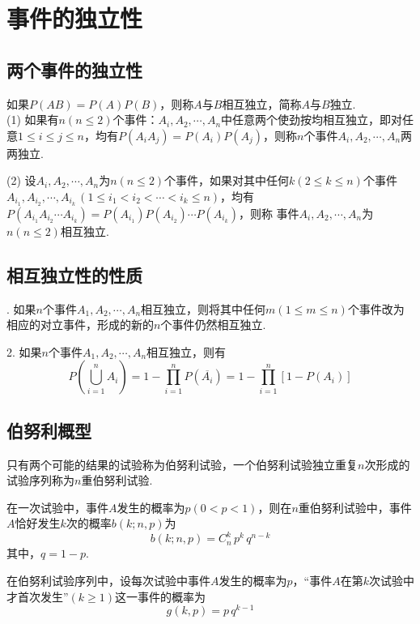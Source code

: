 \section{事件的独立性}
\subsection{两个事件的独立性}
如果$P(AB)=P(A)P(B)$，则称$A$与$B$相互独立，简称$A$与$B$独立.\jg\\
(1)  如果有$n(n\le 2)$个事件：$A_i,A_2,\cdots,A_n$中任意两个使劲按均相互独立，即对任意$1\le i\le j \le n$，均有$P(A_iA_j)=P(A_i)P(A_j)$，则称$n$个事件$A_i,A_2,\cdots,A_n$两两独立.
\par (2)  设$A_i,A_2,\cdots,A_n$为$n(n\le 2)$个事件，如果对其中任何$k(2\le k\le n)$个事件$A_{i_1},A_{i_2},\cdots,A_{i_k}\,(1 \le i_1<i_2<\cdots<i_k\le n)$，均有$P(A_{i_1}A_{i_2}\cdots A_{i_k})=P(A_{i_1})P(A_{i_2})\cdots P(A_{i_k})$，则称
事件$A_i,A_2,\cdots,A_n$为$n(n\le 2)$相互独立.

\subsection{相互独立性的性质}
.  如果$n$个事件$A_1,A_2,⋯,A_n$相互独立，则将其中任何$m(1\leq m \leq n)$个事件改为相应的对立事件，形成的新的$n$个事件仍然相互独立.
\par 2.  如果$n$个事件$A_1,A_2,⋯,A_n$相互独立，则有
\begin{equation}
	P\left( \bigcup_{i=1}^{n} A_i\right) =1-\prod_{i=1}^{n}P\left(\overline{A_i} \right) =1-\prod_{i=1}^{n}\left[1- P\left(A_i \right)\right]
\end{equation}

\subsection{伯努利概型}
\tdefination[伯努利概型]
只有两个可能的结果的试验称为伯努利试验，一个伯努利试验独立重复$n$次形成的试验序列称为$n$重伯努利试验.
\jg

\theorem[伯努利定理]
在一次试验中，事件$A$发生的概率为$p(0<p<1)$，则在$n$重伯努利试验中，事件$A$恰好发生$k$次的概率$b(k;n,p)$为
\begin{equation}
b(k;n,p)=C_n^k\,p^k\,q^{n-k}
\end{equation}
其中，$q=1-p.$
\par 在伯努利试验序列中，设每次试验中事件$A$发生的概率为$p$，“事件$A$在第$k$次试验中才首次发生”$(k≥1)$这一事件的概率为
\begin{equation}
g(k,p)=p\,q^{k-1}
\end{equation}



